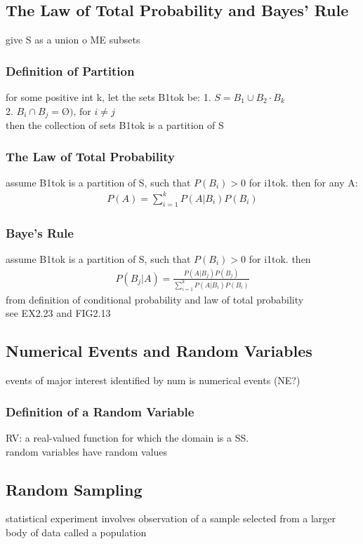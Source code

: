 \documentclass[12pt]{article}
\begin{document}
\subsection{The Law of Total Probability and Bayes' Rule}
    give S as a union o ME subsets
    \subsubsection{Definition of Partition}
        for some positive int k, let the sets B1tok be:
        1. $ S = B_{1}\cup B_{2}\cdot B_{k} $\\
        2. $ B_{i}\cap B_{j} = \text{\O), for } i \ne j $\\
        then the collection of sets B1tok is a partition of S
    \subsubsection{The Law of Total Probability}
        assume B1tok is a partition of S, such that 
        $ P(B_{i}) > 0 $ for i1tok. then for any A:
        \begin{align*}
            P(A) = \sum_{i= 1}^{k}P(A|B_{i})P(B_{i})
        \end{align*}
    \subsubsection{Baye's Rule}
        assume B1tok is a partition of S, such that
        $ P(B_{i}) > 0 $ for i1tok. then
        \begin{align*}
            P(B_{j}|A) = \frac{P(A|B_{j})P(B_{j})}
            { \sum_{i= 1}^{k}P(A|B_{i})P(B_{i}) }
        \end{align*}
        from definition of conditional probability and
        law of total probability\\
        see EX2.23 and FIG2.13
\subsection{Numerical Events and Random Variables}
    events of major interest identified by num is 
    numerical events (NE?)
    \subsubsection{Definition of a Random Variable}
        RV: a real-valued function for which the domain is a SS.\\
        random variables have random values 
\subsection{Random Sampling}
    statistical experiment involves observation of a sample
    selected from a larger body of data called a population
\end{document}
